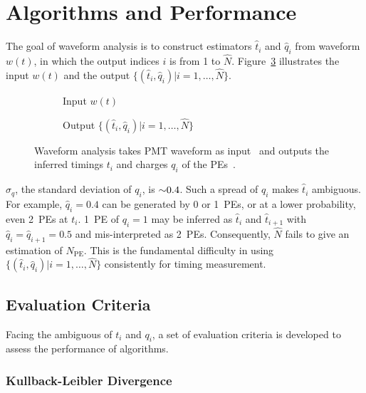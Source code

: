 \section{Algorithms and Performance} %
\label{sec:algorithm}

The goal of waveform analysis is to construct estimators $\hat{t}_i$ and $\hat{q}_i$ from waveform $w(t)$, in which the output indices $i$ is from 1 to $\hat{N}$.  Figure~\ref{fig:io} illustrates the input $w(t)$ and the output $\{(\hat{t}_i, \hat{q}_i)|i=1,\ldots,\hat{N}\}$.
\begin{figure}[H]
  \centering
  \begin{subfigure}{.45\textwidth}
    \resizebox{\textwidth}{!}{}
    \caption{\label{fig:input} Input $w(t)$}
  \end{subfigure}
  \begin{subfigure}{.45\textwidth}
    \resizebox{\textwidth}{!}{}
    \caption{\label{fig:output} Output $\{(\hat{t}_i, \hat{q}_i)|i=1,\ldots,\hat{N}\}$}
  \end{subfigure}
  \caption{\label{fig:io}Waveform analysis takes PMT waveform as input~ and outputs the inferred timings $t_i$ and charges $q_i$ of the PEs~.}
\end{figure}

$\sigma_q$, the standard deviation of $q_i$, is $\num{\sim 0.4}$.  Such a spread of $q_i$ makes $\hat{t}_i$ ambiguous. For example, $\hat{q}_i=0.4$ can be generated by 0 or 1~PEs, or at a lower probability, even 2~PEs at $t_i$. 1~PE of $q_i=1$ may be inferred as $\hat{t}_i$ and $\hat{t}_{i+1}$ with $\hat{q}_i=\hat{q}_{i+1}=0.5$ and mis-interpreted as 2~PEs.  Consequently, $\hat{N}$ fails to give an estimation of $N_\mathrm{PE}$.  This is the fundamental difficulty in using $\{(\hat{t}_i, \hat{q}_i)|i=1,\ldots,\hat{N}\}$ consistently for timing measurement.

\subsection{Evaluation Criteria}
\label{sec:criteria}
Facing the ambiguous of $t_i$ and $q_i$, a set of evaluation criteria is developed to assess the performance of algorithms. 

\subsubsection{Kullback-Leibler Divergence}
\label{sec:pseudo}


